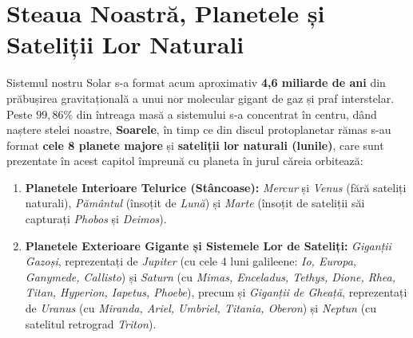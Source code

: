 \chapter{Steaua Noastră, Planetele și Sateliții Lor Naturali}
\label{chap:planete}

Sistemul nostru Solar s-a format acum aproximativ \textbf{4,6 miliarde de ani} din prăbușirea gravitațională a unui nor molecular gigant de gaz și praf interstelar. Peste $99{,}86\%$ din întreaga masă a sistemului s-a concentrat în centru, dând naștere stelei noastre, \textbf{Soarele}, în timp ce din discul protoplanetar rămas s-au format \textbf{cele 8 planete majore} și \textbf{sateliții lor naturali (lunile)}, care sunt prezentate în acest capitol împreună cu planeta în jurul căreia orbitează:
\begin{enumerate}[leftmargin=1.6em, itemsep=2pt]
  \item \textbf{Planetele Interioare Telurice (Stâncoase):} \emph{Mercur} și \emph{Venus} (fără sateliți naturali), \emph{Pământul} (însoțit de \emph{Lună}) și \emph{Marte} (însoțit de sateliții săi capturați \emph{Phobos} și \emph{Deimos}).
  \item \textbf{Planetele Exterioare Gigante și Sistemele Lor de Sateliți:} \emph{Giganții Gazoși}, reprezentați de \emph{Jupiter} (cu cele 4 luni galileene: \emph{Io, Europa, Ganymede, Callisto}) și \emph{Saturn} (cu \emph{Mimas, Enceladus, Tethys, Dione, Rhea, Titan, Hyperion, Iapetus, Phoebe}), precum și \emph{Giganții de Gheață}, reprezentați de \emph{Uranus} (cu \emph{Miranda, Ariel, Umbriel, Titania, Oberon}) și \emph{Neptun} (cu satelitul retrograd \emph{Triton}).
\end{enumerate}


